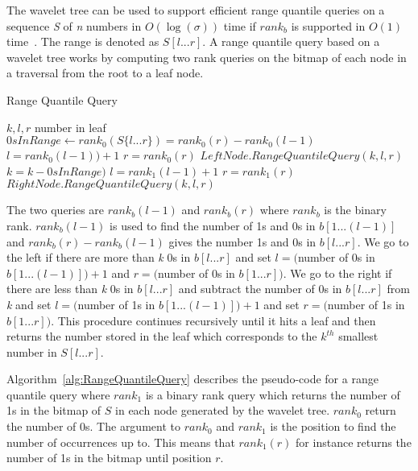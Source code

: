The wavelet tree can be used to support efficient range quantile queries on a sequence \textit{S} of \textit{n} numbers in $O(\log(\sigma))$ time if $rank_b$ is supported in $O(1)$ time~\citep[Section 3]{RangeQuantileQueries}. 
The range is denoted as $S[l ... r]$.
A range quantile query based on a wavelet tree works by computing two rank queries on the bitmap of each node in a traversal from the root to a leaf node. 

\begin{algorithm}
\caption{Range Quantile Query}
\label{alg:RangeQuantileQuery}
\begin{algorithmic}
 {$k,l,r$}
	\State \Return number in leaf
\EndIf
\State $\textit{0}sInRange \gets rank_0(S \lbrace l...r \rbrace) = rank_0(r) - rank_0(l-1)$
	\State $l = rank_0(l-1))+1$
	\State $r = rank_0(r)$
	\State \Return $LeftNode.RangeQuantileQuery(k,l,r)$
\Else
	\State $k = k - \textit{0}sInRange)$
	\State $l = rank_1(l-1)+1$
	\State $r = rank_1(r)$
	\State \Return $RightNode.RangeQuantileQuery(k,l,r)$
\EndIf

\EndFunction
\end{algorithmic}
\end{algorithm}

The two queries are $rank_b(l-1)$ and $rank_b(r)$ where $rank_b$ is the binary rank.
$rank_b(l-1)$ is used to find the number of 1s and 0s in $b[1...(l-1)]$ and $rank_b(r) - rank_b(l-1)$ gives the number 1s and 0s in $b[l...r]$. 
We go to the left if there are more than \textit{k} 0s in $b[l...r]$ and set $l = ($number of 0s in $b[1...(l-1)])+1$ and $r=($number of 0s in $b[1...r])$. 
We go to the right if there are less than \textit{k} 0s in $b[l...r]$ and subtract the number of 0s in $b[l...r]$ from \textit{k} and set $l = ($number of 1s in $b[1...(l-1)])+1$ and set $r=($number of 1s in $b[1...r])$. 
This procedure continues recursively until it hits a leaf and then returns the number stored in the leaf which corresponds to the $k^{th}$ smallest number in $S[l...r]$.

Algorithm~\ref{alg:RangeQuantileQuery} describes the pseudo-code for a range quantile query where $rank_1$ is a binary rank query which returns the number of 1s in the bitmap of $S$ in each node generated by the wavelet tree. 
$rank_0$ return the number of 0s.
The argument to $rank_0$ and $rank_1$ is the position to find the number of occurrences up to.
This means that $rank_1(r)$ for instance returns the number of 1s in the bitmap until position $r$.

